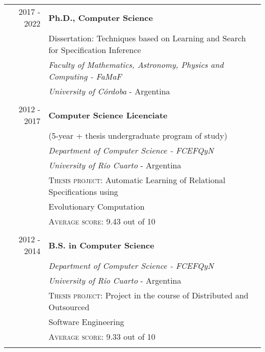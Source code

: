 \documentclass[a4paper,10pt]{article} %
\begin{document}
\begin{tabular}{rl}
\\
\textsc{2017 - 2022}	& \textbf{Ph.D., Computer Science} \\
& Dissertation: Techniques based on Learning and Search for Specification Inference \\
& \textit{Faculty of Mathematics, Astronomy, Physics and Computing - FaMaF} \\ & \textit{University of Córdoba} - Argentina \\ & \\

\textsc{2012 - 2017}	& \textbf{Computer Science Licenciate} \\
& (5-year + thesis undergraduate program of study) \\
& \textit{Department of Computer Science - FCEFQyN} \\ & \textit{University of Río Cuarto} - Argentina \\ 
& \textsc{Thesis project:} Automatic Learning of Relational Specifications using \\ 
& Evolutionary Computation \\ 
& \textsc{Average score:} 9.43 out of 10 \\ & \\

\textsc{2012 - 2014}	& \textbf{B.S. in Computer Science} \\
& \textit{Department of Computer Science - FCEFQyN} \\ 
& \textit{University of Río Cuarto} - Argentina \\
& \textsc{Thesis project:} Project in the course of Distributed and Outsourced \\ 
& Software Engineering \\ 
& \textsc{Average score:} 9.33 out of 10 \\ \\ 

\end{tabular}
\end{document}
